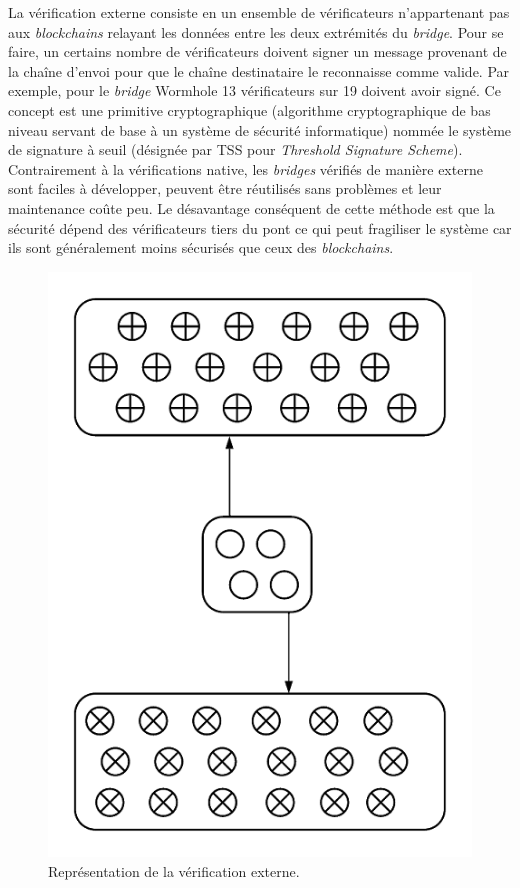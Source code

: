 \pagebreak

La vérification externe consiste en un ensemble de vérificateurs n’appartenant pas aux \textit{\gls{blockchain}s} relayant les données entre les deux extrémités du \textit{bridge}. Pour se faire, un certains nombre de vérificateurs doivent signer un message provenant de la chaîne d’envoi pour que le chaîne destinataire le reconnaisse comme valide. Par exemple, pour le \textit{bridge} Wormhole 13 vérificateurs sur 19 doivent avoir signé\cite{NomadDocsExternal}. Ce concept est une primitive cryptographique (algorithme cryptographique de bas niveau servant de base à un système de sécurité informatique) nommée le système de signature à seuil (désignée par TSS pour \textit{Threshold Signature Scheme})\cite{BinanceTSS}. 
Contrairement à la vérifications native, les \textit{bridges} vérifiés de manière externe sont faciles à développer, peuvent être réutilisés sans problèmes et leur maintenance coûte peu. Le désavantage conséquent de cette méthode est que la sécurité dépend des vérificateurs tiers du pont ce qui peut fragiliser le système car ils sont généralement moins sécurisés que ceux des \textit{\gls{blockchain}s}. \\
\begin{figure}[h!]
    \centering
\includegraphics[scale=0.50]{centralisation/imagesBridges/DiagrammeVerifExterne.png}
\caption{Représentation de la vérification externe.}
\label{fig:ExternalVerif}
\end{figure}

